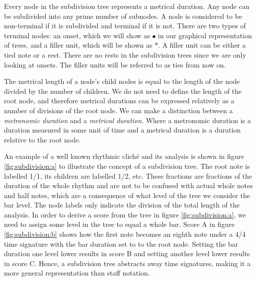 Every node in the subdivision tree represents a metrical duration. Any node can be subdivided into any prime number of subnodes. A node is considered to be non-terminal if it is subdivided and terminal if it is not. There are two types of terminal nodes: an onset, which we will show as $\bullet$ in our graphical representation of trees, and a filler unit, which will be shown as $*$. A filler unit can be either a tied note or a rest. There are no rests in the subdivision trees since we are only looking at onsets. The filler units will be referred to as ties from now on.

The metrical length of a node's child nodes is equal to the length of the node divided by the number of children. We do not need to define the length of the root node, and therefore metrical durations can be expressed relatively as a number of divisions of the root node. We can make a distinction between a \textit{metronomic duration} and a \textit{metrical duration}. Where a metronomic duration is a duration measured in some unit of time and a metrical duration is a duration relative to the root node. 

An example of a well known rhythmic clich\'e and its analysis is shown in figure \ref{fig:subdivision:a} to illustrate the concept of a subdivision tree. The root note is labelled 1/1,  its children are labelled 1/2, etc. These fractions are fractions of the duration of the whole rhythm and are not to be confused with actual whole notes and half notes, which are a consequence of what level of the tree we consider the bar level. The node labels only indicate the division of the total length of the analysis. In order to derive a score from the tree in figure \ref{fig:subdivision:a}, we need to assign some level in the tree to equal a whole bar. Score A in figure \ref{fig:subdivision:b} shows how the first note becomes an eighth note under a 4/4 time signature with the bar duration set to to the root node. Setting the bar duration one level lower results in score B and setting another level lower results in score C. Hence, a subdivision tree abstracts away time signatures, making it a more general representation than staff notation.


